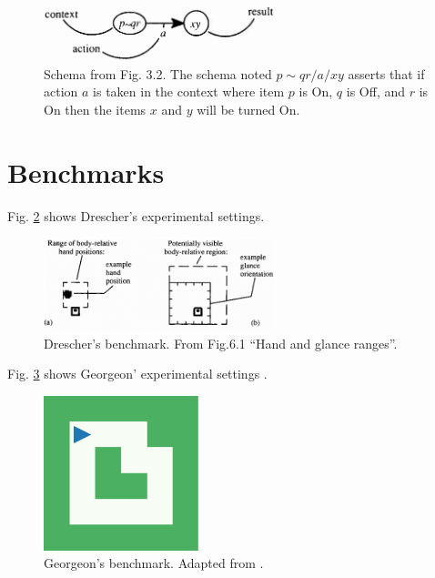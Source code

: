 \documentclass[runningheads]{llncs}
\begin{document}
\begin{figure}
	\centering
	\includegraphics[width=0.6\textwidth]{Figure_2_schema_drescher.png}
	\caption{Schema from \cite{drescher_made-up_1991} Fig. 3.2.
	The schema noted $p \!\sim\! qr/a/xy$ asserts that if action $a$ is taken in the context where item $p$ is On, $q$ is Off, and $r$ is On then the items $x$ and $y$ will be turned On.} 
	\label{fig:drescher}
\end{figure}

\cite{drescher_made-up_1991}
\cite{chaput_constructivist_2004}
\cite{perotto_computational_nodate} 
\cite{guerin_piagetian_2008}
\cite{wang_new_2012}

\section{Benchmarks}

Fig. \ref{fig:drescher2} shows Drescher's experimental settings.


\begin{figure}
	\centering
	\includegraphics[width=0.6\textwidth]{Figure_drescher_expe.png}
	\caption{Drescher's benchmark. From \cite{drescher_made-up_1991} Fig.6.1 ``Hand and glance ranges''.} 
	\label{fig:drescher2}
\end{figure}


Fig. \ref{fig:georgeon} shows Georgeon' experimental settings \cite{georgeon_intrinsically-motivated_2012}.


\begin{figure}
	\centering
	\includegraphics[width=0.4\textwidth]{Figure_grid_plot.pdf}
	\caption{Georgeon's benchmark. Adapted from \cite{georgeon_intrinsically-motivated_2012} .} 
	\label{fig:georgeon}
\end{figure}
\end{document}
